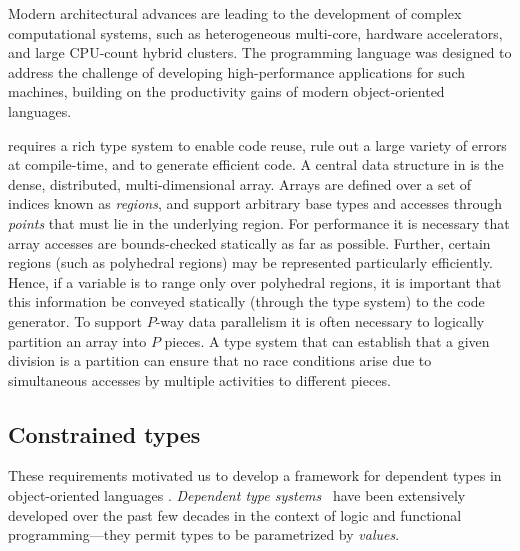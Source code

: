 

Modern architectural advances are leading to the development of
complex computational systems, such as heterogeneous multi-core,
hardware accelerators, and large CPU-count hybrid clusters.
The \Xten{} programming language \cite{X10-concur,x10-oopsla05,X10} was
designed to address the challenge of developing
high-performance applications for such machines, building on the
productivity gains of modern object-oriented languages.

\Xten{} requires a rich type system
to enable code reuse, rule out a large variety of errors at
compile-time, and to generate efficient code.
A central
data structure in \Xten{} is the dense, distributed, multi-dimensional
array.  Arrays are defined over a set of indices known as \emph{regions},
and support arbitrary base types and accesses through {\em
points} that must lie in the underlying region. For performance it is
necessary that array accesses are
bounds-checked statically as far as possible.
Further, certain regions (such as
polyhedral regions) may be represented particularly
efficiently.  Hence, if a variable is to range only over
polyhedral regions, it is important that this information be conveyed
statically (through the type system) to the code 
generator. To support $P$-way data parallelism it is often necessary
to logically partition an array into $P$ pieces. A type system that
can establish that a given division is a partition can ensure that no
race conditions arise due to simultaneous accesses by
multiple activities to different pieces.

\subsection{Constrained types}

These requirements motivated us to develop a framework for dependent
types in object-oriented languages \cite{constrained-types}.  \emph{Dependent type
systems}~\cite{dependent-types,xi99dependent,calc-constructions}
have been extensively developed over the past few decades in the
context of logic and functional programming---they permit types to be
parametrized by \emph{values}.

